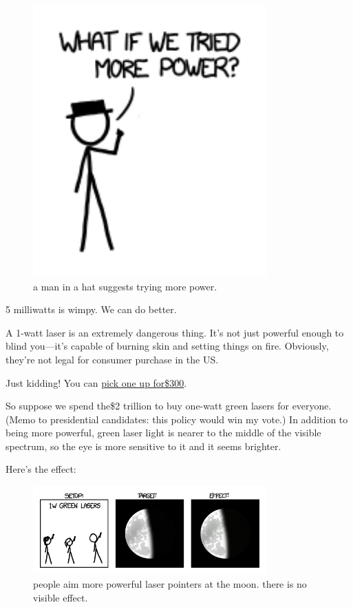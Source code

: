 \begin{figure}[!htbp]
\centering
\includegraphics[scale=0.5, max width=0.8\textwidth]{imgs/a/13/laser_pointer_more_power.png}
\caption{a man in a hat suggests trying more power.}
\end{figure}

{5 milliwatts is wimpy. We can do better.}

{A 1-watt laser is an extremely dangerous thing. It’s not just powerful enough to blind you—it’s capable of burning skin and setting things on fire. Obviously, they’re not legal for consumer purchase in the US.}

{Just kidding! You can \href{http://www.wickedlasers.com/arctic}{pick one up for\$300}.}

{So suppose we spend the\$2 trillion to buy one-watt green lasers for everyone. (Memo to presidential candidates: this policy would win my vote.) In addition to being more powerful, green laser light is nearer to the middle of the visible spectrum, so the eye is more sensitive to it and it seems brighter.}

{Here’s the effect:}

\begin{figure}[!htbp]
\centering
\includegraphics[scale=0.5, max width=0.8\textwidth]{imgs/a/13/laser_pointer_1w.png}
\caption{people aim more powerful laser pointers at the moon. there is no visible effect.}
\end{figure}

